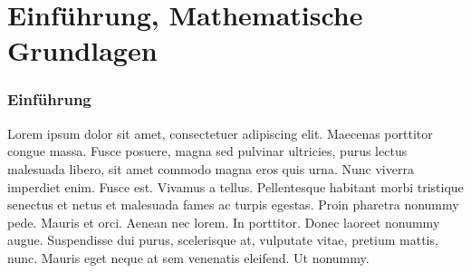 \section{Einführung, Mathematische Grundlagen}

\begin{frame}
    \frametitle{Einführung}
		
    Lorem ipsum dolor sit amet, consectetuer adipiscing elit. Maecenas porttitor congue massa. Fusce posuere, magna sed pulvinar ultricies, purus lectus malesuada libero, sit amet commodo magna eros quis urna.
    Nunc viverra imperdiet enim. Fusce est. Vivamus a tellus.
    Pellentesque habitant morbi tristique senectus et netus et malesuada fames ac turpis egestas. Proin pharetra nonummy pede. Mauris et orci.
    Aenean nec lorem. In porttitor. Donec laoreet nonummy augue.
    Suspendisse dui purus, scelerisque at, vulputate vitae, pretium mattis, nunc. Mauris eget neque at sem venenatis eleifend. Ut nonummy.      
\end{frame}